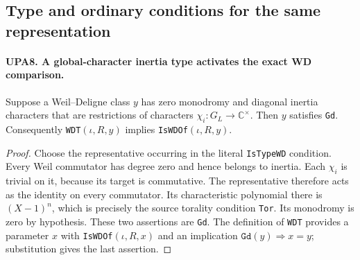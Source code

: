 \documentclass[11pt,a4paper]{article}
\numberwithin{equation}{section}
\theoremstyle{remark}\newtheorem{remark}[theorem]{Remark}
\begin{document}
\subsection{Type and ordinary conditions for the same representation}

\paragraph{UPA8. A global-character inertia type activates the exact WD comparison.}
\label{claim:UPA8}
Suppose a Weil--Deligne class $y$ has zero monodromy and
diagonal inertia characters that are restrictions of
characters $\chi_i:G_L\to\mathbb C^\times$.
Then $y$ satisfies \texttt{Gd}.  Consequently
\texttt{WDT}$(\iota,R,y)$ implies
\texttt{Is\allowbreak WDOf}$(\iota,R,y)$.
\begin{proof}
Choose the representative occurring in the literal
\texttt{Is\allowbreak Type\allowbreak WD} condition.  Every Weil commutator has
degree zero and hence belongs to inertia.  Each $\chi_i$
is trivial on it, because its target is commutative.
The representative therefore acts as the identity on
every commutator.  Its characteristic polynomial there
is $(X-1)^n$, which is precisely the source torality
condition \texttt{Tor}.  Its monodromy is zero by
hypothesis.  These two assertions are \texttt{Gd}.
The definition of \texttt{WDT} provides a parameter $x$
with \texttt{Is\allowbreak WDOf}$(\iota,R,x)$ and an implication
$\texttt{Gd}(y)\Rightarrow x=y$; substitution gives the
last assertion.
\end{proof}

\end{document}
